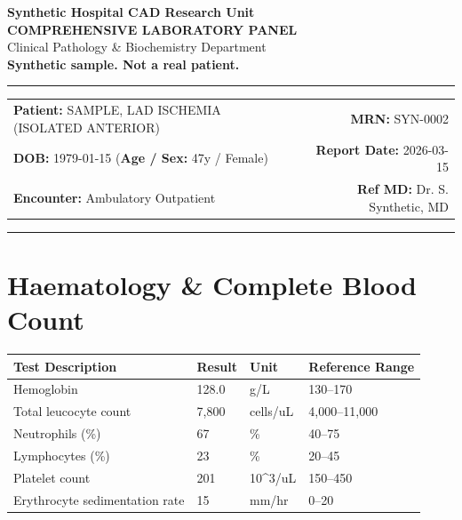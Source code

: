 \documentclass[10pt,a4paper]{article}
\begin{document}
\begin{center}
  {\Large \textbf{Synthetic Hospital CAD Research Unit}}\\
  \vspace{2pt}
  {\normalsize \textbf{COMPREHENSIVE LABORATORY PANEL}}\\
  \vspace{1pt}
  {\footnotesize \textcolor{subtext}{Clinical Pathology \& Biochemistry Department}}\\
  \vspace{4pt}
  {\small \textbf{\textcolor{red!75!black}{Synthetic sample. Not a real patient.}}}\\
  \vspace{3pt}
  \textcolor{linecolor}{\rule{\textwidth}{0.8pt}}
\end{center}

\vspace{2pt}

\noindent
\begin{tabular*}{\textwidth}{@{} l @{\extracolsep{\fill}} r @{}}
  \textbf{Patient:} SAMPLE, LAD ISCHEMIA (ISOLATED ANTERIOR) & \textbf{MRN:} SYN-0002 \\
  \textbf{DOB:} 1979-01-15 \quad (\textbf{Age / Sex:} 47y / Female) & \textbf{Report Date:} 2026-03-15 \\
  \textbf{Encounter:} Ambulatory Outpatient & \textbf{Ref MD:} Dr. S. Synthetic, MD \\
\end{tabular*}

\vspace{2pt}
\noindent\textcolor{linecolor}{\rule{\textwidth}{0.4pt}}
\vspace{6pt}


\section*{Haematology \& Complete Blood Count}

\begin{tabular}{@{} p{6.4cm} p{2.5cm} p{2.5cm} p{3.1cm} @{}}
  \toprule
  \textbf{Test Description} & \textbf{Result} & \textbf{Unit} & \textbf{Reference Range} \\
  \midrule
  Hemoglobin & 128.0 & g/L & 130--170 \\
  Total leucocyte count & 7,800 & cells/uL & 4,000--11,000 \\
  Neutrophils (\%) & 67 & \% & 40--75 \\
  Lymphocytes (\%) & 23 & \% & 20--45 \\
  Platelet count & 201 & 10\textasciicircum 3/uL & 150--450 \\
  Erythrocyte sedimentation rate & 15 & mm/hr & 0--20 \\
  \bottomrule
\end{tabular}
\end{document}
